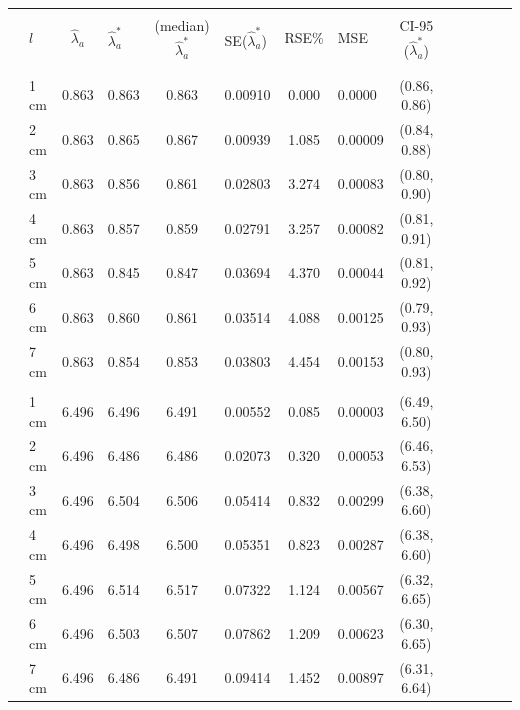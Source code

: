 \documentclass[a4paper 12pt]{article}
\numberwithin{equation}{section}
\begin{document}
\clearpage
 \begin{small}
\begin{table}[h!]
\centering
\setlength\tabcolsep{11.5pt} 
\begin{footnotesize}
\begin{tabular}{clclclclclclcl}
  \hline \\ [0.3ex]
&  $l$ & $\hat{\lambda}_{a}$  & $\hat{\lambda}_{a}^{*}$ & (median) $\hat{\lambda}_{a}^{*}$ & SE($\hat{\lambda}_{a}^{*}$) & RSE\%  & MSE  &  CI-95 ($\hat{\lambda}_{a}^{*}$) \\ [1.0ex]
\hline \\
 \raisebox{1ex}{\bf age 1}  \\ [1.0ex]
&   1 cm & 0.863 &    0.863  & 0.863 &         0.00910& 0.000 & 0.0000  & (0.86, 0.86)\\
&   2 cm & 0.863 &    0.865  & 0.867 &         0.00939& 1.085 & 0.00009 & (0.84, 0.88)\\
&   3 cm & 0.863 &    0.856  & 0.861 &         0.02803& 3.274 & 0.00083 & (0.80, 0.90) \\
&   4 cm & 0.863 &    0.857  & 0.859 &         0.02791& 3.257 & 0.00082 & (0.81, 0.91) \\
&   5 cm & 0.863 &    0.845  & 0.847 &         0.03694& 4.370 & 0.00044 & (0.81, 0.92)\\
&   6 cm & 0.863 &    0.860  & 0.861 &         0.03514& 4.088 & 0.00125 & (0.79, 0.93)\\
&   7 cm & 0.863 &    0.854  & 0.853 &         0.03803& 4.454 & 0.00153 & (0.80, 0.93)\\[1.5ex]

 \raisebox{1ex}{\bf age 2}  \\ [1.0ex]
&    1 cm & 6.496 &    6.496 & 6.491 &          0.00552& 0.085 & 0.00003 & (6.49, 6.50)\\
&    2 cm & 6.496 &    6.486 & 6.486 &          0.02073& 0.320 & 0.00053 & (6.46, 6.53)\\
&    3 cm & 6.496 &    6.504 & 6.506 &          0.05414& 0.832 & 0.00299 & (6.38, 6.60)\\
&    4 cm & 6.496 &    6.498 & 6.500 &          0.05351& 0.823 & 0.00287 & (6.38, 6.60)\\
&    5 cm & 6.496 &    6.514 & 6.517 &          0.07322& 1.124 & 0.00567 & (6.32, 6.65)\\
&    6 cm & 6.496 &    6.503 & 6.507 &          0.07862& 1.209 & 0.00623 & (6.30, 6.65)\\
&    7 cm & 6.496 &    6.486 & 6.491 &          0.09414& 1.452 & 0.00897 & (6.31, 6.64)\\[1.5ex]


\end{tabular}
\end{footnotesize}
\end{table}
\end{small}
\end{document}
